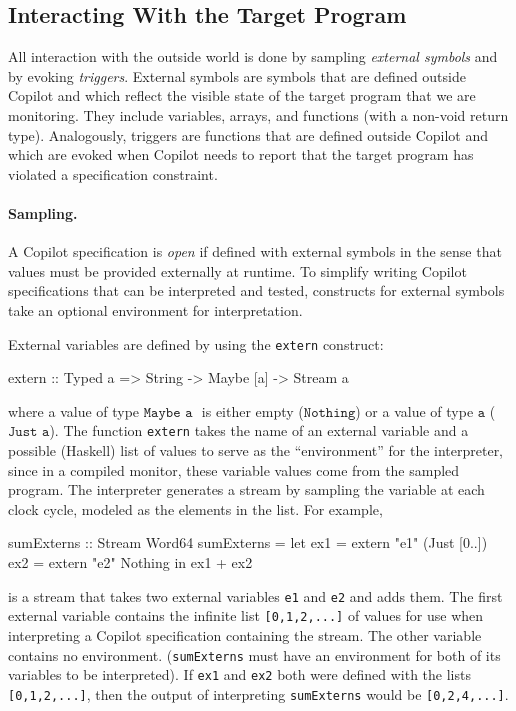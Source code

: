 \subsection{Interacting With the Target Program}
\label{sec:interacting}

All interaction with the outside world is done by sampling
\emph{external symbols} and by evoking \emph{triggers}.  External
symbols are symbols that are defined outside Copilot and which reflect
the visible state of the target program that we are monitoring.  They
include variables, arrays, and functions (with a non-void return
type).  Analogously, triggers are functions that are defined outside
Copilot and which are evoked when Copilot needs to report that the
target program has violated a specification constraint.

\paragraph{Sampling.}
A Copilot specification is \emph{open} if defined with external
symbols in the sense that values must be provided externally at
runtime.  To simplify writing Copilot specifications that can be
interpreted and tested, constructs for external symbols take an
optional environment for interpretation.

External variables are defined by using the {\tt extern} construct:
%
\begin{code}
extern :: Typed a => String -> Maybe [a] -> Stream a
\end{code}
%
\noindent
where a value of type $\texttt{Maybe a }$ is either empty ($\texttt{Nothing}$)
or a value of type $\texttt{a}$ ($\texttt{Just a}$).  The function
\texttt{extern} takes the name of an external variable and a possible (Haskell)
list of values to serve as the ``environment'' for the interpreter, since in a
compiled monitor, these variable values come from the sampled program.  The
interpreter generates a stream by sampling the variable at each clock cycle,
modeled as the elements in the list.  For example,
%
\begin{code}
sumExterns :: Stream Word64
sumExterns = let ex1 = extern "e1" (Just [0..])
                 ex2 = extern "e2" Nothing
             in  ex1 + ex2
\end{code}
%
is a stream that takes two external variables {\tt e1} and {\tt e2} and adds
them.  The first external variable contains the infinite list {\tt [0,1,2,...]}
of values for use when interpreting a Copilot specification containing the
stream.  The other variable contains no environment.  ({\tt sumExterns} must have
an environment for both of its variables to be interpreted).  If {\tt ex1} and
{\tt ex2} both were defined with the lists {\tt [0,1,2,...]}, then the output of
interpreting {\tt sumExterns} would be {\tt [0,2,4,...]}.


